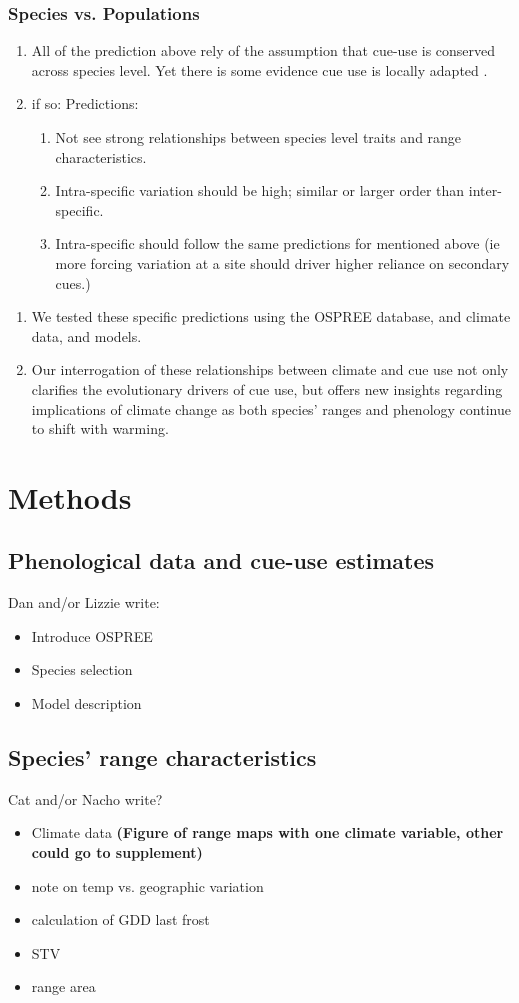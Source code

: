 \documentclass[11pt]{article}\usepackage[]{graphicx}\usepackage[]{color}
\begin{document}
\subsubsection{Species vs. Populations}
\begin{enumerate}
\item All of the prediction above rely of the assumption that cue-use is conserved across species level. Yet there is some evidence cue use is locally adapted \citep{}.
\item if so: Predictions:
\begin{enumerate}
\item Not see strong relationships between species level traits and range characteristics.
\item Intra-specific variation should be high; similar or larger order than inter-specific.
\item Intra-specific should follow the same predictions for mentioned above (ie more forcing variation at a site should driver higher reliance on secondary cues.)
\end{enumerate}
\end{enumerate}
\begin{enumerate}
\item We tested these specific predictions using the OSPREE database, and climate data, and models. %
\item Our interrogation of these relationships between climate and cue use not only clarifies the evolutionary drivers of cue use, but offers new insights regarding implications of climate change as both species' ranges and phenology continue to shift with warming.
\end{enumerate}
\section*{Methods}
\subsection*{Phenological data and cue-use estimates}
Dan and/or Lizzie write:
\begin{itemize}
\item Introduce OSPREE
\item Species selection
\item Model description
\end{itemize}

\subsection*{Species' range characteristics}
Cat and/or Nacho write?\\
\begin{itemize}
\item Climate data \textbf{(Figure of range maps with one climate variable, other could go to supplement)}
\item note on temp vs. geographic variation
\item calculation of GDD last frost
\item STV
\item range area
\end{itemize}
\end{document}
